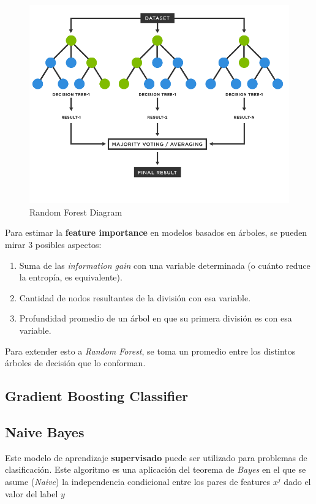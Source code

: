 \begin{figure}[H]
    \center
    \includegraphics[scale=0.25]{notebooks/ML/img/random_forest_diagram.png}
    \caption{Random Forest Diagram}
\end{figure}

Para estimar la \textbf{feature importance} en modelos basados en árboles, se pueden mirar 3 posibles aspectos: 
\begin{enumerate}
    \item Suma de las \textit{information gain} con una variable determinada (o cuánto reduce la entropía, es equivalente). 
    \item Cantidad de nodos resultantes de la división con esa variable. 
    \item Profundidad promedio de un árbol en que su primera división es con esa variable. 
\end{enumerate}

Para extender esto a \textit{Random Forest}, se toma un promedio entre los distintos árboles de decisión que lo conforman. 

\subsection{Gradient Boosting Classifier}



\subsection{Naive Bayes}

Este modelo de aprendizaje \textbf{supervisado} puede ser utilizado para problemas de clasificación. Este algoritmo es una aplicación del teorema de \textit{Bayes} en el que se asume (\textit{Naive}) la independencia condicional entre los pares de features $x^j$ dado el valor del label $y$

